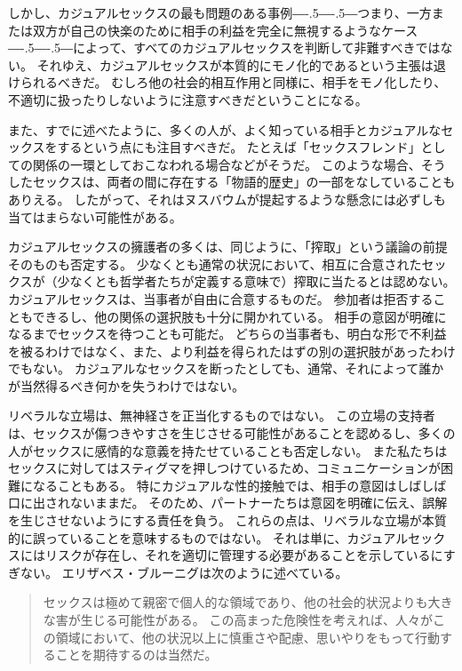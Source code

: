 \documentclass[paper=a4,book,openany]{jlreq}
\def\DDASH{―\kern-.5\zw―\kern-.5\zw―} %
\begin{document}
しかし、カジュアルセックスの最も問題のある事例{\DDASH}つまり、一方または双方が自己の快楽のために相手の利益を完全に無視するようなケース{\DDASH}によって、すべてのカジュアルセックスを判断して非難すべきではない。
それゆえ、カジュアルセックスが本質的にモノ化的であるという主張は退けられるべきだ。
むしろ他の社会的相互作用と同様に、相手をモノ化したり、不適切に扱ったりしないように注意すべきだということになる。

また、すでに述べたように、多くの人が、よく知っている相手とカジュアルなセックスをするという点にも注目すべきだ。
たとえば「セックスフレンド」としての関係の一環としておこなわれる場合などがそうだ。
このような場合、そうしたセックスは、両者の間に存在する「物語的歴史」の一部をなしていることもありえる。
したがって、それはヌスバウムが提起するような懸念には必ずしも当てはまらない可能性がある。

カジュアルセックスの擁護者の多くは、同じように、「搾取」という議論の前提そのものも否定する。
少なくとも通常の状況において、相互に合意されたセックスが（少なくとも哲学者たちが定義する意味で）搾取に当たるとは認めない。
カジュアルセックスは、当事者が自由に合意するものだ。
参加者は拒否することもできるし、他の関係の選択肢も十分に開かれている。
相手の意図が明確になるまでセックスを待つことも可能だ。
どちらの当事者も、明白な形で不利益を被るわけではなく、また、より利益を得られたはずの別の選択肢があったわけでもない。
カジュアルなセックスを断ったとしても、通常、それによって誰かが当然得るべき何かを失うわけではない。

リベラルな立場は、無神経さを正当化するものではない。
この立場の支持者は、セックスが傷つきやすさを生じさせる可能性があることを認めるし、多くの人がセックスに感情的な意義を持たせていることも否定しない。
また私たちはセックスに対してはスティグマを押しつけているため、コミュニケーションが困難になることもある。
特にカジュアルな性的接触では、相手の意図はしばしば口に出されないままだ。
そのため、パートナーたちは意図を明確に伝え、誤解を生じさせないようにする責任を負う。
これらの点は、リベラルな立場が本質的に誤っていることを意味するものではない。
それは単に、カジュアルセックスにはリスクが存在し、それを適切に管理する必要があることを示しているにすぎない。
エリザベス・ブルーニグは次のように述べている。

\begin{quote}
  セックスは極めて親密で個人的な領域であり、他の社会的状況よりも大きな害が生じる可能性がある。
この高まった危険性を考えれば、人々がこの領域において、他の状況以上に慎重さや配慮、思いやりをもって行動することを期待するのは当然だ。
\citep{bruenig18:_aziz_ansar_debac}

\end{quote}
\end{document}
